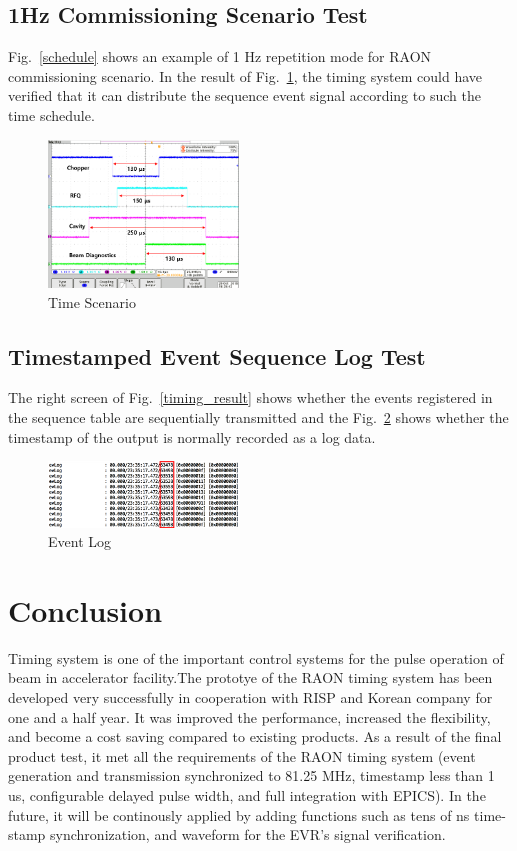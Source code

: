 \documentclass[journal,reqno]{IEEEtran}
\begin{document}
\subsection{1Hz Commissioning Scenario Test}
Fig.~\ref{schedule} shows an example of 1 Hz repetition mode for RAON commissioning scenario. In the result of Fig.~\ref{scenario}, the timing system could have verified that it can distribute the sequence event signal according to such the time schedule.

\begin{figure}[!htb]
	\centering
	\includegraphics*[width=0.45\textwidth, height=0.35\textwidth]{1hz_scenario.png}
	\caption{Time Scenario}
	\label{scenario}
\end{figure}

\subsection{Timestamped Event Sequence Log Test}
The right screen of Fig.~\ref{timing_result} shows whether the events registered in the sequence table are sequentially transmitted and the Fig.~\ref*{event_log} shows whether the timestamp of the output is normally recorded as a log data.

\begin{figure}[!htb]
	\centering
	\includegraphics*[width=0.45\textwidth, height=0.13\textwidth]{img23.png}
	\caption{Event Log}
	\label{event_log}
\end{figure}

\section{Conclusion}
Timing system is one of the important control systems for the pulse operation of beam in accelerator facility.The prototye of the RAON timing system has been developed very successfully in cooperation with RISP and Korean company for one and a half year. It was improved the performance, increased the flexibility, and become a cost saving compared to existing products. As a result of the final product test, it met all the requirements of the RAON timing system (event generation and transmission synchronized to 81.25 MHz, timestamp less than 1 us,  configurable delayed pulse width, and full integration with EPICS). In the future, it will be continously applied by adding functions such as tens of ns time-stamp synchronization, and waveform for the EVR's signal verification.
\end{document}
